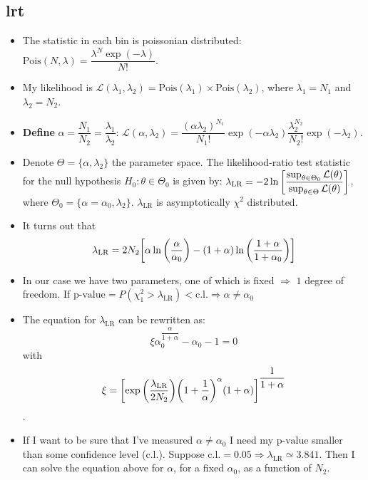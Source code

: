 \documentclass[12pt,a4paper]{article}
\begin{document}
\subsection{\acrfull{lrt}}
\begin{itemize}
    \item The statistic in each bin is poissonian distributed: \(\mathrm{Pois}(N, \lambda) = \dfrac{\lambda^N \exp(-\lambda)}{N!}\).
    \item My likelihood is \(\mathcal{L}(\lambda_1, \lambda_2) = \text{Pois}(\lambda_1) \times \text{Pois}(\lambda_2)\), where \(\lambda_1 = N_1\) and \(\lambda_2 = N_2\).
    \item \textbf{Define} \(\alpha = \dfrac{N_1}{N_2} = \dfrac{\lambda_1}{\lambda_2}\): \(\mathcal{L}(\alpha, \lambda_2) = \dfrac{(\alpha \lambda_2)^{N_1}}{N_1!} \exp(-\alpha \lambda_2) \dfrac{\lambda_2^{N_2}}{N_2!} \exp(-\lambda_2)\).
    \item Denote \(\Theta = \{\alpha, \lambda_2\}\) the parameter space. The likelihood-ratio test statistic for the null hypothesis \(H_0 : \theta \in \Theta_0\) is given by: \(\lambda_\text{LR} = -2 \ln\qty[\dfrac{\sup_{\theta \in \Theta_0} \mathcal{L}(\theta)}{\sup_{\theta \in \Theta} \mathcal{L}(\theta)}]\), where \(\Theta_0 = \{\alpha = \alpha_0, \lambda_2\}\). \(\lambda_\text{LR}\) is asymptotically \(\chi^2\) distributed.
    \item It turns out that \begin{equation} \label{eq:lambdaLR}
        \lambda_\text{LR} = 2 N_2 \qty[\alpha\ln\qty(\dfrac{\alpha}{\alpha_0}) - \qty(1 + \alpha) \ln\qty(\dfrac{1 + \alpha}{1 + \alpha_0})]
    \end{equation}
    \item In our case we have two parameters, one of which is fixed \(\Longrightarrow\) \(1\) degree of freedom. If \(\text{p-value} = P(\chi^2_1 > \lambda_\text{LR}) < \text{c.l.} \Longrightarrow \alpha \neq \alpha_0\)
    \item The equation for \(\lambda_\text{LR}\) can be rewritten as: \begin{equation} \label{eq:lambdaLR2}
        \xi \alpha_0^{\dfrac{\alpha}{1 + \alpha}} - \alpha_0 - 1 = 0
    \end{equation} with \begin{equation} \label{eq:xi}
        \xi = \qty[\exp\qty(\dfrac{\lambda_\text{LR}}{2N_2}) \qty(1 + \dfrac{1}{\alpha})^\alpha (1 + \alpha)]^{\dfrac{1}{1 + \alpha}}
    \end{equation}.
    \item If I want to be sure that I've measured \(\alpha \neq \alpha_0\) I need my \(\text{p-value}\) smaller than some confidence level (\(\text{c.l.}\)). Suppose \(\text{c.l.} = 0.05 \Longrightarrow \lambda_\text{LR} \simeq 3.841\). Then I can solve the equation above for \(\alpha\), for a fixed \(\alpha_0\), as a function of \(N_2\).
\end{itemize}
\end{document}
